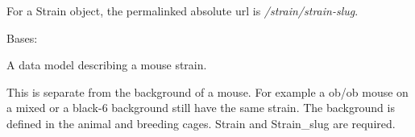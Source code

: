 \documentclass[letterpaper,10pt,english]{sphinxmanual}
\begin{document}
\begin{fulllineitems}

\begin{fulllineitems}
\label{api:mousedb.animal.models.Strain.breeding_set}
\end{fulllineitems}


\begin{fulllineitems}
\label{api:mousedb.animal.models.Strain.get_absolute_url}
For a Strain object, the permalinked absolute url is \emph{/strain/strain-slug}.

\end{fulllineitems}


\begin{fulllineitems}
\label{api:mousedb.animal.models.Strain.objects}
\end{fulllineitems}


\begin{fulllineitems}
\label{api:mousedb.animal.models.Strain.study_set}
\end{fulllineitems}


\end{fulllineitems}


\begin{fulllineitems}
Bases: 

A data model describing a mouse strain.

This is separate from the background of a mouse.  For example a ob/ob mouse on a mixed or a black-6 background still have the same strain.  The background is defined in the animal and breeding cages.  Strain and Strain\_slug are required.

\end{fulllineitems}
\end{document}
